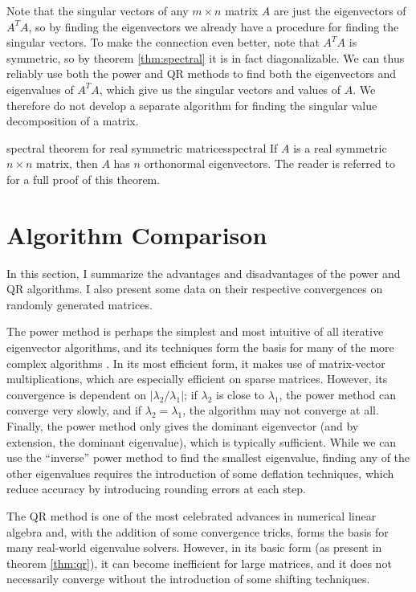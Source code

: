 \documentclass{article}
\begin{document}
Note that the singular vectors of any $m \times n$ matrix $A$ are just the eigenvectors of $A^TA$, so by finding the eigenvectors we already have a procedure for finding the singular vectors. To make the connection even better, note that $A^TA$ is symmetric, so by theorem \ref{thm:spectral} it is in fact diagonalizable. We can thus reliably use both the power and QR methods to find both the eigenvectors and eigenvalues of $A^TA$, which give us the singular vectors and values of $A$. We therefore do not develop a separate algorithm for finding the singular value decomposition of a matrix.

\begin{theorem}{spectral theorem for real symmetric matrices}{spectral}
  If $A$ is a real symmetric $n \times n$ matrix, then $A$ has $n$ orthonormal eigenvectors. The reader is referred to \cite{proof-spectral} for a full proof of this theorem.
\end{theorem}

\section{Algorithm Comparison}
In this section, I summarize the advantages and disadvantages of the power and QR algorithms. I also present some data on their respective convergences on randomly generated matrices.

The power method is perhaps the simplest and most intuitive of all iterative eigenvector algorithms, and its techniques form the basis for many of the more complex algorithms \cite{mit-sensitivity}. In its most efficient form, it makes use of matrix-vector multiplications, which are especially efficient on sparse matrices. However, its convergence is dependent on $|\lambda_2 / \lambda_1|$; if $\lambda_2$ is close to $\lambda_1$, the power method can converge very slowly, and if $\lambda_2 = \lambda_1$, the algorithm may not converge at all. Finally, the power method only gives the dominant eigenvector (and by extension, the dominant eigenvalue), which is typically sufficient. While we can use the ``inverse'' power method to find the smallest eigenvalue, finding any of the other eigenvalues requires the introduction of some deflation techniques, which reduce accuracy by introducing rounding errors at each step.

The QR method is one of the most celebrated advances in numerical linear algebra and, with the addition of some convergence tricks, forms the basis for many real-world eigenvalue solvers. However, in its basic form (as present in theorem \ref{thm:qr}), it can become inefficient for large matrices, and it does not necessarily converge without the introduction of some shifting techniques.
\end{document}
